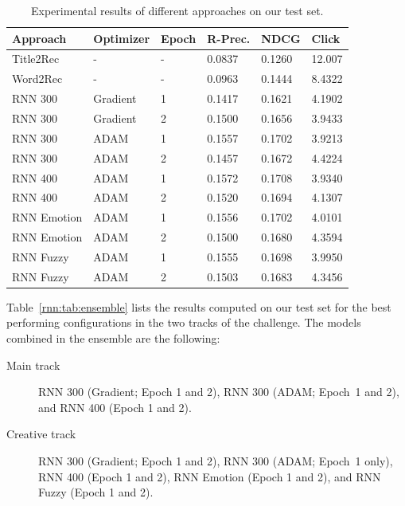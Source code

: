 \begin{table}
\centering
\begin{tabular}{@{}llllll@{}}
\toprule
Approach    & Optimizer & Epoch & R-Prec.     & NDCG   & Click   \\ \midrule
Title2Rec   & -         & -     & 0.0837      & 0.1260 & 12.007  \\
Word2Rec    & -         & -     & 0.0963      & 0.1444 & 8.4322  \\
RNN 300     & Gradient  & 1     & 0.1417      & 0.1621 & 4.1902  \\
RNN 300     & Gradient  & 2     & 0.1500      & 0.1656 & 3.9433  \\
RNN 300     & ADAM      & 1     & 0.1557      & 0.1702 & 3.9213  \\
RNN 300     & ADAM      & 2     & 0.1457      & 0.1672 & 4.4224  \\
RNN 400     & ADAM      & 1     & 0.1572      & 0.1708 & 3.9340  \\
RNN 400     & ADAM      & 2     & 0.1520      & 0.1694 & 4.1307  \\
RNN Emotion & ADAM      & 1     & 0.1556      & 0.1702 & 4.0101  \\
RNN Emotion & ADAM      & 2     & 0.1500      & 0.1680 & 4.3594  \\
RNN Fuzzy   & ADAM      & 1     & 0.1555      & 0.1698 & 3.9950  \\
RNN Fuzzy   & ADAM      & 2     & 0.1503      & 0.1683 & 4.3456  \\ \bottomrule
\end{tabular}
\caption[Results of different approaches]{Experimental results of different approaches on our test set.}
\label{rnn:tab:approaches}
\end{table}

Table~\ref{rnn:tab:ensemble} lists the results computed on our test set for the best performing configurations in the two tracks of the challenge. The models combined in the ensemble are the following:

\begin{description}
\item[Main track] RNN 300 (Gradient; Epoch 1 and 2), RNN 300 (ADAM; Epoch~1 and 2), and RNN 400 (Epoch 1 and 2).
\item[Creative track] RNN 300 (Gradient; Epoch 1 and 2), RNN 300 (ADAM; Epoch~1 only), RNN 400 (Epoch 1 and 2), RNN Emotion (Epoch 1 and 2), and RNN Fuzzy (Epoch 1 and 2).
\end{description}

